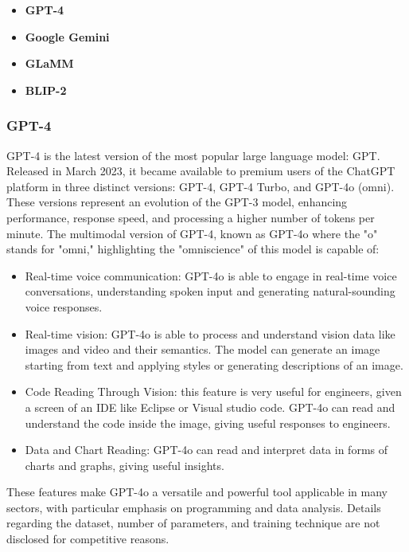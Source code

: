 \begin{itemize}
    \item \textbf{GPT-4}

    \item \textbf{Google Gemini} 

    \item \textbf{GLaMM}

    \item \textbf{BLIP-2}
\end{itemize}

\subsubsection{GPT-4}
GPT-4 is the latest version of the most popular large language model: GPT. Released in March 2023, it became available to premium users of the ChatGPT platform in three distinct versions: GPT-4, GPT-4 Turbo, and GPT-4o (omni). These versions represent an evolution of the GPT-3 model, enhancing performance, response speed, and processing a higher number of tokens per minute.\cite{insights_gpt4} The multimodal version of GPT-4, known as GPT-4o where the "o" stands for "omni," highlighting the "omniscience" of this model is capable of:
\begin{itemize}
    \item Real-time voice communication: GPT-4o is able to engage in real-time voice conversations, understanding spoken input and generating natural-sounding voice responses.

    \item Real-time vision: GPT-4o is able to process and understand vision data like images and video and their semantics. The model can generate an image starting from text and applying styles or generating descriptions of an image.

    \item Code Reading Through Vision: this feature is very useful for engineers, given a screen of an IDE like Eclipse or Visual studio code. GPT-4o can read and understand the code inside the image, giving useful responses to engineers.

    \item Data and Chart Reading: GPT-4o can read and interpret data in forms of charts and graphs, giving useful insights.
\end{itemize}
These features make GPT-4o a versatile and powerful tool applicable in many sectors, with particular emphasis on programming and data analysis. Details regarding the dataset, number of parameters, and training technique are not disclosed for competitive reasons.
